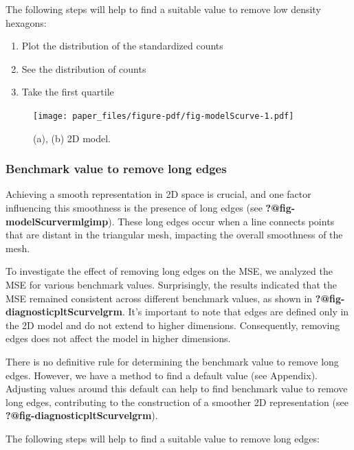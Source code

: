 \documentclass[
  12pt]{article}
\begin{document}
The following steps will help to find a suitable value to remove low
density hexagons:

\begin{enumerate}
\def\labelenumi{\arabic{enumi}.}
\item
  Plot the distribution of the standardized counts
\item
  See the distribution of counts
\item
  Take the first quartile
\end{enumerate}

\begin{figure}

{\centering \texttt{[image: paper\_files/figure-pdf/fig-modelScurve-1.pdf]}

}

\caption{\label{fig-modelScurve}(a), (b) 2D model.}

\end{figure}

\hypertarget{benchmark-value-to-remove-long-edges}{%
\subsubsection{Benchmark value to remove long
edges}\label{benchmark-value-to-remove-long-edges}}

Achieving a smooth representation in 2D space is crucial, and one factor
influencing this smoothness is the presence of long edges (see
\textbf{?@fig-modelScurvermlgimp}). These long edges occur when a line
connects points that are distant in the triangular mesh, impacting the
overall smoothness of the mesh.

To investigate the effect of removing long edges on the MSE, we analyzed
the MSE for various benchmark values. Surprisingly, the results
indicated that the MSE remained consistent across different benchmark
values, as shown in \textbf{?@fig-diagnosticpltScurvelgrm}. It's
important to note that edges are defined only in the 2D model and do not
extend to higher dimensions. Consequently, removing edges does not
affect the model in higher dimensions.

There is no definitive rule for determining the benchmark value to
remove long edges. However, we have a method to find a default value
(see Appendix). Adjusting values around this default can help to find
benchmark value to remove long edges, contributing to the construction
of a smoother 2D representation (see
\textbf{?@fig-diagnosticpltScurvelgrm}).

The following steps will help to find a suitable value to remove long
edges:
\end{document}
